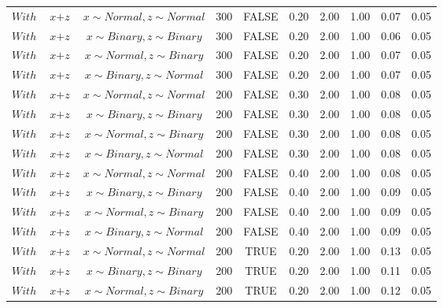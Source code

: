 \begin{longtable}{lccccccccc}
  $With$ & $\textit{x} + \textit{z}$ & $\textit{x} \sim Normal , \textit{z} \sim Normal$ & 300 & FALSE & 0.20 & 2.00 & 1.00 & 0.07 & 0.05 \\ 
  $With$ & $\textit{x} + \textit{z}$ & $\textit{x} \sim Binary, \textit{z} \sim Binary$ & 300 & FALSE & 0.20 & 2.00 & 1.00 & 0.06 & 0.05 \\ 
  $With$ & $\textit{x} + \textit{z}$ & $\textit{x} \sim Normal, \textit{z} \sim Binary$ & 300 & FALSE & 0.20 & 2.00 & 1.00 & 0.07 & 0.05 \\ 
  $With$ & $\textit{x} + \textit{z}$ & $\textit{x} \sim Binary, \textit{z} \sim Normal$ & 300 & FALSE & 0.20 & 2.00 & 1.00 & 0.07 & 0.05 \\ 
  $With$ & $\textit{x} + \textit{z}$ & $\textit{x} \sim Normal , \textit{z} \sim Normal$ & 200 & FALSE & 0.30 & 2.00 & 1.00 & 0.08 & 0.05 \\ 
  $With$ & $\textit{x} + \textit{z}$ & $\textit{x} \sim Binary, \textit{z} \sim Binary$ & 200 & FALSE & 0.30 & 2.00 & 1.00 & 0.08 & 0.05 \\ 
  $With$ & $\textit{x} + \textit{z}$ & $\textit{x} \sim Normal, \textit{z} \sim Binary$ & 200 & FALSE & 0.30 & 2.00 & 1.00 & 0.08 & 0.05 \\ 
  $With$ & $\textit{x} + \textit{z}$ & $\textit{x} \sim Binary, \textit{z} \sim Normal$ & 200 & FALSE & 0.30 & 2.00 & 1.00 & 0.08 & 0.05 \\ 
  $With$ & $\textit{x} + \textit{z}$ & $\textit{x} \sim Normal , \textit{z} \sim Normal$ & 200 & FALSE & 0.40 & 2.00 & 1.00 & 0.08 & 0.05 \\ 
  $With$ & $\textit{x} + \textit{z}$ & $\textit{x} \sim Binary, \textit{z} \sim Binary$ & 200 & FALSE & 0.40 & 2.00 & 1.00 & 0.09 & 0.05 \\ 
  $With$ & $\textit{x} + \textit{z}$ & $\textit{x} \sim Normal, \textit{z} \sim Binary$ & 200 & FALSE & 0.40 & 2.00 & 1.00 & 0.09 & 0.05 \\ 
  $With$ & $\textit{x} + \textit{z}$ & $\textit{x} \sim Binary, \textit{z} \sim Normal$ & 200 & FALSE & 0.40 & 2.00 & 1.00 & 0.09 & 0.05 \\ 
  $With$ & $\textit{x} + \textit{z}$ & $\textit{x} \sim Normal , \textit{z} \sim Normal$ & 200 & TRUE & 0.20 & 2.00 & 1.00 & 0.13 & 0.05 \\ 
  $With$ & $\textit{x} + \textit{z}$ & $\textit{x} \sim Binary, \textit{z} \sim Binary$ & 200 & TRUE & 0.20 & 2.00 & 1.00 & 0.11 & 0.05 \\ 
  $With$ & $\textit{x} + \textit{z}$ & $\textit{x} \sim Normal, \textit{z} \sim Binary$ & 200 & TRUE & 0.20 & 2.00 & 1.00 & 0.12 & 0.05 \\ 

\end{longtable}
